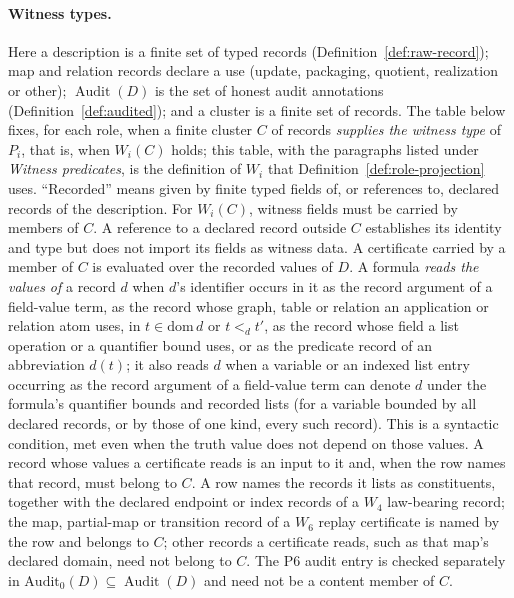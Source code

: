 \documentclass[11pt]{article}
\theoremstyle{definition}
\newcommand{\Audit}[1]{\ensuremath{\operatorname{Audit}\!\left(#1\right)}}
\newcommand{\Psix}{\ensuremath{\mathrm{P6}}}
\begin{document}
\paragraph{Witness types.} Here a description is a finite set of typed
records (Definition~\ref{def:raw-record}); map and relation records declare a
use (update, packaging, quotient, realization or other); \(\Audit{D}\) is the
set of honest audit annotations (Definition~\ref{def:audited}); and a cluster
is a finite set of records. The table below fixes, for each role, when a
finite cluster \(C\) of records \emph{supplies the witness type} of \(P_i\),
that is, when \(W_i(C)\) holds; this table, with the paragraphs listed under \emph{Witness predicates}, is the definition of \(W_i\) that Definition~\ref{def:role-projection} uses. ``Recorded'' means
given by finite typed fields of, or references to, declared records of the
description. For \(W_i(C)\), witness fields must be carried by members of
\(C\). A reference to a declared record outside \(C\) establishes its identity
and type but does not import its fields as witness data. A certificate
carried by a member of \(C\) is evaluated over the recorded values of \(D\). A formula \emph{reads the values of} a record \(d\) when \(d\)'s identifier occurs in it as the record argument of a field-value term, as the record whose graph, table or relation an application or relation atom uses, in \(t\in\mathrm{dom}\,d\) or \(t<_d t'\), as the record whose field a list operation or a quantifier bound uses, or as the predicate record of an abbreviation \(d(t)\); it also reads \(d\) when a variable or an indexed list entry occurring as the record argument of a field-value term can denote \(d\) under the formula's quantifier bounds and recorded lists (for a variable bounded by all declared records, or by those of one kind, every such record). This is a syntactic condition, met even when the truth value does not depend on those values. A
record whose values a certificate reads is an input to it and, when the row names that
record, must belong to \(C\). A row names the records it lists as
constituents, together with the declared endpoint or index records of a
\(W_4\) law-bearing record; the map, partial-map or transition record of a \(W_6\) replay certificate is named by the row and belongs to \(C\); other records a certificate reads, such as that map's
declared domain, need not belong to
\(C\). The \Psix{} audit
entry is checked separately in \(\mathrm{Audit}_0(D)\subseteq\Audit{D}\) and need not be a content member
of \(C\).
\end{document}
